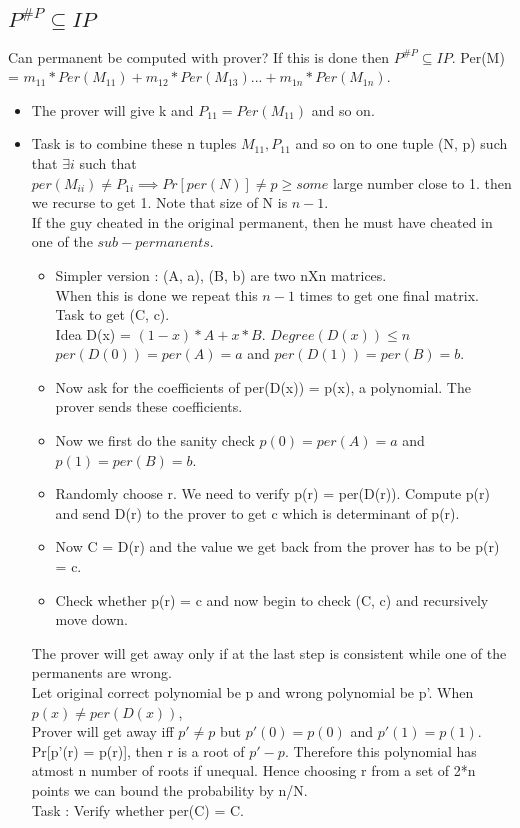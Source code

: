 \documentclass[solution,addpoints,12pt]{exam}
\begin{document}
\subsection{$P^{\#P} \subseteq IP$}
Can permanent be computed with prover?
If this is done then $P^{\#P} \subseteq IP$.
Per(M) = $m_{11}*Per(M_{11}) + m_{12}*Per(M_{13})...+m_{1n}*Per(M_{1n})$.
\begin{itemize}
\item The prover will give k and $P_{11} = Per(M_{11})$ and so on.
\item
Task is to combine these n tuples $M_{11}, P_{11}$ and so on
to one tuple (N, p) such that $\exists i$ such that\\
$per(M_{ii}) \ne P_{1i} \implies Pr[per(N)] \ne p \ge some$ large
number close to 1. then we recurse to get 1. Note that size of N is $n-1$.\\
If the guy cheated in the original permanent, then he
must have cheated in one of the $sub-permanents$.
\begin{itemize}
\item
Simpler version : (A, a), (B, b) are two nXn matrices.\\
When this is done we repeat this $n-1$ times to get one final matrix.
Task to get (C, c).\\
Idea D(x) = $(1-x)*A + x*B$.
$Degree(D(x)) \le n$
$per(D(0)) = per(A) = a$ and $per(D(1)) = per(B) = b$.\\
\item
Now ask for the coefficients of per(D(x)) = p(x), a polynomial.
The prover sends these coefficients.
\item
Now we first do the sanity check
$p(0) = per(A) = a$ and $p(1) = per(B) = b$.\\
\item
Randomly choose r. We need to verify p(r) = per(D(r)).
Compute p(r) and send D(r) to the prover to get c which is
determinant of p(r).
\item
Now C = D(r) and the value we get back from
the prover has to be p(r) = c.
\item
Check whether p(r) = c and now begin to
check (C, c) and recursively move down.
\end{itemize}
The prover will get away only if at the last step
is consistent while one of the permanents are wrong.\\

Let original correct polynomial be p and wrong polynomial be p'.
When $p(x) \ne per(D(x))$,\\
Prover will get away iff $p' \ne p$ but
$p'(0) = p(0)$ and $p'(1) = p(1)$.\\
Pr[p'(r) = p(r)], then r is a root of $p'-p$.
Therefore this polynomial has atmost n number of roots
if unequal. Hence choosing r from a set of 2*n points we can bound the
probability by n/N.\\
Task : Verify whether per(C) = C.\\


\end{itemize}
\end{document}
